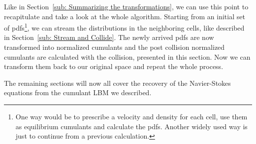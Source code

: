 
Like in Section~\ref{sub: Summarizing the transformations}, we can use this point to recapitulate and take a look at the whole algorithm.
Starting from an initial set of \glspl{pdf}\footnote{
One way would be to prescribe a velocity and density for each cell, use them as equilibrium cumulants and calculate the \glspl{pdf}.
Another widely used way is just to continue from a previous calculation.
}, we can stream the distributions in the neighboring cells, like described in Section~\ref{sub: Stream and Collide}.
The newly arrived \glspl{pdf} are now transformed into normalized cumulants and the post collision normalized cumulants are calculated with the collision, presented in this section.
Now we can transform them back to our original space and repeat the whole process.

The remaining sections will now all cover the recovery of the Navier-Stokes equations from the cumulant LBM we described.
